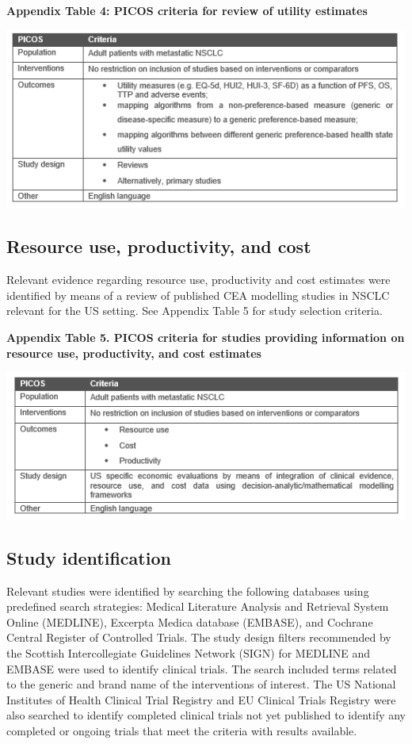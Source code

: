 \documentclass[11pt,final,fleqn]{article}\usepackage[]{graphicx}\usepackage[]{color}
\theoremstyle{plain}
\begin{document}
{\begin{appendices}
\textbf{Appendix Table 4: PICOS criteria for review of utility estimates}

\includegraphics[scale=1]{tables/picos-utility.png} 

\subsection{Resource use, productivity, and cost}

Relevant evidence regarding resource use, productivity and cost estimates were identified by means of a review of published CEA modelling studies in NSCLC relevant for the US setting.  See Appendix Table 5 for study selection criteria.

\textbf{Appendix Table 5. PICOS criteria for studies providing information on resource use, productivity, and cost estimates} 

\includegraphics[scale=1]{tables/picos-costs.png} 

\subsection{Study identification}

Relevant studies were identified by searching the following databases using predefined search strategies: Medical Literature Analysis and Retrieval System Online (MEDLINE), Excerpta Medica database (EMBASE), and Cochrane Central Register of Controlled Trials. The study design filters recommended by the Scottish Intercollegiate Guidelines Network (SIGN) for MEDLINE and EMBASE were used to identify clinical trials. The search included terms related to the generic and brand name of the interventions of interest. The US National Institutes of Health Clinical Trial Registry and EU Clinical Trials Registry were also searched to identify completed clinical trials not yet published to identify any completed or ongoing trials that meet the criteria with results available.


\end{appendices}}
\end{document}
